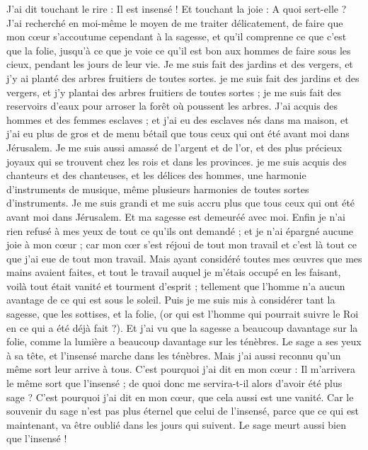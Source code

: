 \begin{multicols}{2}
J'ai dit touchant le rire : Il est insensé ! Et touchant la joie : A quoi sert-elle ?
J'ai recherché en moi-même le moyen de me traiter délicatement, de faire que mon cœur s'accoutume cependant à la sagesse, et qu'il comprenne ce que c'est que la folie, jusqu’à ce que je voie ce qu'il est bon aux hommes de faire sous les cieux, pendant les jours de leur vie. 
Je me suis fait des jardins et des vergers, et j'y ai planté des arbres fruitiers de toutes sortes.
je me suis fait des jardins et des vergers, et j'y plantai des arbres fruitiers de toutes sortes ;
je me suis fait des reservoirs d'eaux pour arroser la forêt où poussent les arbres.
J'ai acquis des hommes et des femmes esclaves ; et j'ai eu des esclaves nés dans ma maison, et j'ai eu plus de gros et de menu bétail que tous ceux qui ont été avant moi dans Jérusalem. 
Je me suis aussi amassé de l'argent et de l'or, et des plus précieux joyaux qui se trouvent chez les rois et dans les provinces. je me suis acquis des chanteurs et des chanteuses, et les délices des hommes, une harmonie d'instruments de musique, même plusieurs harmonies de toutes sortes d'instruments. 
Je me suis grandi et me suis accru plus que tous ceux qui ont été avant moi dans Jérusalem. Et ma sagesse est demeuréé avec moi.
Enfin je n'ai rien refusé à mes yeux de tout ce qu'ils ont demandé ; et je n'ai épargné aucune joie à mon cœur ; car mon cœr s'est réjoui de tout mon travail et c'est là tout ce que j'ai eue de tout mon travail.
Mais ayant considéré toutes mes œuvres que mes mains avaient faites, et tout le travail auquel je m'étais occupé en les faisant, voilà tout était vanité et tourment d'esprit ; tellement que l'homme n'a aucun avantage de ce qui est sous le soleil.
Puis je me suis mis à considérer tant la sagesse, que les sottises, et la folie, (or qui est l'homme qui pourrait suivre le Roi en ce qui a été déjà fait ?).
Et j'ai vu que la sagesse a beaucoup davantage sur la folie, comme la lumière a beaucoup davantage sur les ténèbres.
Le sage a ses yeux à sa tête, et l'insensé marche dans les ténèbres. Mais j'ai aussi reconnu qu'un même sort leur arrive à tous.
C'est pourquoi j'ai dit en mon cœur : Il m'arrivera le même sort que l'insensé ; de quoi donc me servira-t-il alors d'avoir été plus sage ? C'est pourquoi j'ai dit en mon cœur, que cela aussi est une vanité. 
Car le souvenir du sage n'est pas plus éternel que celui de l'insensé, parce que ce qui est maintenant, va être oublié dans les jours qui suivent. Le sage meurt aussi bien que l'insensé !

\end{multicols}

